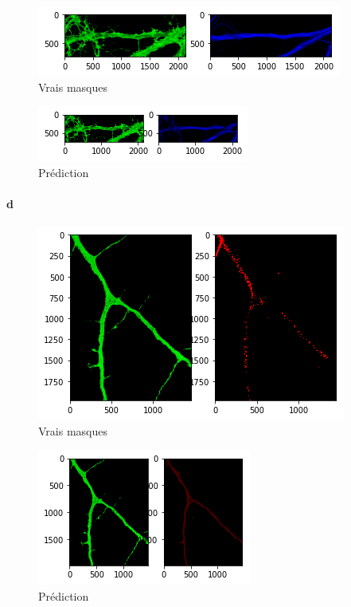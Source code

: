 \documentclass{report}
\begin{document}
 \begin{figure}[H]
 \centering
 \includegraphics[scale=0.55]{"397_truth"}
 \caption{Vrais masques}
 \end{figure}

 \begin{figure}[H]
 \centering
 \includegraphics[scale=0.75]{"397_result"}
 \caption{Prédiction}
 \end{figure}

 \paragraph{d}

 \begin{figure}[H]
 \centering
 \includegraphics[scale=0.55]{"2_truth_axons"}
 \caption{Vrais masques}
 \end{figure}

 \begin{figure}[H]
 \centering
 \includegraphics[scale=0.75]{"2_result_axons"}
 \caption{Prédiction}
 \end{figure}
\end{document}
